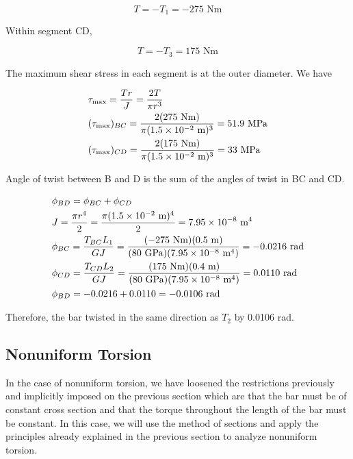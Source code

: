 \documentclass[a4paper,openany,12pt]{book}
\begin{document}
$$T =  - T_1 =  - 275\text{ Nm}$$

Within segment CD,

$$T =  - T_3 = 175\text{ Nm}$$

The maximum shear stress in each segment is at the outer diameter. We
have

$$\begin{gathered}
  \tau _{\max } = \frac{Tr}{J} = \frac{2T}{\pi r^3} \hfill \\
  (\tau _{\max })_{BC} = \frac{2(275\text{ Nm})}{\pi (1.5 \times 10^{ - 2}\text{ m})^3} = 51.9\text{ MPa} \hfill \\
  (\tau _{\max })_{CD} = \frac{2(175\text{ Nm})}{\pi (1.5 \times 10^{ - 2}\text{ m})^3} = 33\text{ MPa} \hfill \\ 
\end{gathered}$$

Angle of twist between B and D is the sum of the angles of twist in BC
and CD.

$$\begin{gathered}
  \phi_{BD} = \phi _{BC} + \phi _{CD} \hfill \\
  J = \frac{\pi r^4}{2} = \frac{\pi (1.5 \times 10^{ - 2} \text{ m})^4}{2} =
  7.95 \times 10^{ - 8} \text{ m}^4 \hfill \\
  \phi_{BC} = \frac{T_{BC}L_1}{GJ} = \frac{( - 275\text{ Nm})(0.5\text{ m})}{(80\text{ GPa})(7.95 \times 10^{-8}\text{ m}^4)} =  - 0.0216\text{ rad} \hfill \\
  \phi_{CD} = \frac{T_{CD}L_2}{GJ} = \frac{(175\text{ Nm})(0.4\text{ m})}{(80\text{ GPa})(7.95 \times 10^{-8}\text{ m}^4)} = 0.0110\text{ rad} \hfill \\
  \phi_{BD} =  - 0.0216 + 0.0110 =  - 0.0106\text{ rad} \hfill \\ 
\end{gathered}$$

Therefore, the bar twisted in the same direction as \(T_2\) by 0.0106 rad.

\subsection{Nonuniform Torsion}
\label{sec:orgc86055c}
In the case of nonuniform torsion, we have loosened the restrictions
previously and implicitly imposed on the previous section which are that
the bar must be of constant cross section and that the torque throughout
the length of the bar must be constant. In this case, we will use the
method of sections and apply the principles already explained in the
previous section to analyze nonuniform torsion.
\end{document}
